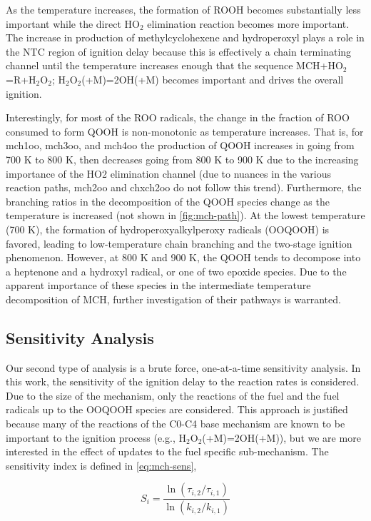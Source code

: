 \documentclass[12pt, letterpaper]{article}
\begin{document}
As the temperature increases, the formation of ROOH becomes substantially less 
important while the direct HO$_2$ elimination reaction becomes more important. 
The increase in production of methylcyclohexene and hydroperoxyl plays a role 
in the NTC region of ignition delay because this is effectively a chain 
terminating channel until the temperature increases enough that the sequence 
MCH+HO$_2$=R+H$_2$O$_2$; H$_2$O$_2$(+M)=2OH(+M) becomes important and drives 
the overall ignition.

Interestingly, for most of the ROO radicals, the change in the fraction of ROO 
consumed to form QOOH is non-monotonic as temperature increases. That is, for 
mch1oo, mch3oo, and mch4oo the production of QOOH increases in going from 700 K 
to 800 K, then decreases going from 800 K to 900 K due to the increasing 
importance of the HO2 elimination channel (due to nuances in the various 
reaction paths, mch2oo and chxch2oo do not follow this trend). Furthermore, 
the branching ratios in the decomposition of the QOOH species change as the 
temperature is increased (not shown in \autoref{fig:mch-path}). At the lowest 
temperature (700 K), the formation of hydroperoxyalkylperoxy radicals (OOQOOH) 
is favored, leading to low-temperature chain branching and the two-stage 
ignition phenomenon. However, at 800 K and 900 K, the QOOH tends to decompose 
into a heptenone and a hydroxyl radical, or one of two epoxide species. Due to 
the apparent importance of these species in the intermediate temperature 
decomposition of MCH, further investigation of their pathways is warranted.

\subsection{Sensitivity Analysis}
\label{sec:sensitivity-analysis}

Our second type of analysis is a brute force, one-at-a-time sensitivity 
analysis. In this work, the sensitivity of the ignition delay to the reaction 
rates is considered. Due to the size of the mechanism, only the reactions of 
the fuel and the fuel radicals up to the OOQOOH species are considered. This 
approach is justified because many of the reactions of the C0-C4 base 
mechanism are known to be important to the ignition process (e.g., 
H$_2$O$_2$(+M)=2OH(+M)), but we are more interested in the effect of updates to 
the fuel specific sub-mechanism. The sensitivity index is defined in 
\autoref{eq:mch-sens},

\begin{equation}
    \label{eq:mch-sens}
    S_i = \frac{\ln\left(\tau_{i,2}/\tau_{i,1}\right)}{\ln\left(k_{i,2}/k_{i,1}\right)}
\end{equation}
\end{document}

